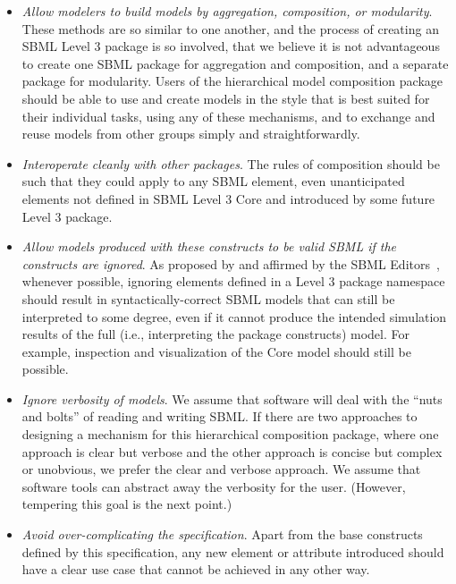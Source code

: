 \begin{itemize}

\item \emph{Allow modelers to build models by aggregation, composition, or modularity}.  These methods are so similar to one another, and the process of creating an SBML Level 3 package is so involved, that we believe it is not advantageous to create one SBML package for aggregation and composition, and a separate package for modularity. Users of the hierarchical model composition package should be able to use and create models in the style that is best suited for their individual tasks, using any of these mechanisms, and to exchange and reuse models from other groups simply and straightforwardly.

\item \emph{Interoperate cleanly with other packages}. The rules of composition should be such that they could apply to any SBML element, even unanticipated elements not defined in SBML Level 3 Core and introduced by some future Level 3 package.

\item \emph{Allow models produced with these constructs to be valid SBML if the constructs are ignored}.  As proposed by \citet*{lenov:2003} and affirmed by the SBML Editors~\citep{editors:2010}, whenever possible, ignoring elements defined in a Level 3 package namespace should result in syntactically-correct SBML models that can still be interpreted to some degree, even if it cannot produce the intended simulation results of the full (i.e., interpreting the package constructs) model.  For example, inspection and visualization of the Core model should still be possible.

\item \emph{Ignore verbosity of models}. We assume that software will deal with the ``nuts and bolts'' of reading and writing SBML.  If there are two approaches to designing a mechanism for this hierarchical composition package, where one approach is clear but verbose and the other approach is concise but complex or unobvious, we prefer the clear and verbose approach.  We assume that software tools can abstract away the verbosity for the user.  (However, tempering this goal is the next point.)

\item \emph{Avoid over-complicating the specification}. Apart from the base constructs defined by this specification, any new element or attribute introduced should have a clear use case that cannot be achieved in any other way.


\end{itemize}
